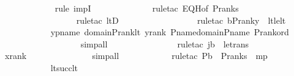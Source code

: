 \begin{isabellebody}
\ \ \ \ \ \ \ \ \ \ \ \isamarkupfalse%
\ {\isacharparenleft}{\kern0pt}rule\ impI{\isacharparenright}{\kern0pt}\ \isanewline
\ \ \ \ \ \ \ \ \ \ \ \isamarkupfalse%
\ {\isacharparenleft}{\kern0pt}rule{\isacharunderscore}{\kern0pt}tac\ EQH{\isacharbrackleft}{\kern0pt}of\ {\isachardoublequoteopen}P{\isacharunderscore}{\kern0pt}rank{\isacharparenleft}{\kern0pt}s{\isacharparenright}{\kern0pt}{\isachardoublequoteclose}{\isacharbrackright}{\kern0pt}{\isacharparenright}{\kern0pt}\ \isanewline
\ \ \ \ \ \ \ \ \ \ \ \ \ \ \ \ \isamarkupfalse%
\ {\isacharparenleft}{\kern0pt}rule{\isacharunderscore}{\kern0pt}tac\ ltD{\isacharparenright}{\kern0pt}\ \isanewline
\ \ \ \ \ \ \ \ \ \ \ \ \ \ \ \ \isamarkupfalse%
{\isacharparenleft}{\kern0pt}rule{\isacharunderscore}{\kern0pt}tac\ b{\isacharequal}{\kern0pt}{\isachardoublequoteopen}P{\isacharunderscore}{\kern0pt}rank{\isacharparenleft}{\kern0pt}y{\isacharparenright}{\kern0pt}{\isachardoublequoteclose}\ \ lt{\isacharunderscore}{\kern0pt}le{\isacharunderscore}{\kern0pt}lt{\isacharparenright}{\kern0pt}\ \isanewline
\ \ \ \ \ \ \ \ \ \ \isamarkupfalse%
\ ypname\ domain{\isacharunderscore}{\kern0pt}P{\isacharunderscore}{\kern0pt}rank{\isacharunderscore}{\kern0pt}lt\ yrank\ P{\isacharunderscore}{\kern0pt}name{\isacharunderscore}{\kern0pt}domain{\isacharunderscore}{\kern0pt}P{\isacharunderscore}{\kern0pt}name\ P{\isacharunderscore}{\kern0pt}rank{\isacharunderscore}{\kern0pt}ord\ \isanewline
\ \ \ \ \ \ \ \ \ \ \ \ \ \ \ \ \ \isamarkupfalse%
\ simp{\isacharunderscore}{\kern0pt}all\ \ \ \isanewline
\ \ \ \ \ \ \ \ \ \ \ \isamarkupfalse%
\ {\isacharparenleft}{\kern0pt}rule{\isacharunderscore}{\kern0pt}tac\ j{\isacharequal}{\kern0pt}b\ \ le{\isacharunderscore}{\kern0pt}trans{\isacharparenright}{\kern0pt}\ \isanewline
\ \ \ \ \ \ \ \ \ \ \isamarkupfalse%
\ xrank\ \isanewline
\ \ \ \ \ \ \ \ \ \ \ \ \isamarkupfalse%
\ simp{\isacharunderscore}{\kern0pt}all\ \isanewline
\ \ \ \ \ \ \ \ \ \ \isamarkupfalse%
{\isacharparenleft}{\kern0pt}rule{\isacharunderscore}{\kern0pt}tac\ P{\isacharequal}{\kern0pt}{\isachardoublequoteopen}b\ {\isacharless}{\kern0pt}\ P{\isacharunderscore}{\kern0pt}rank{\isacharparenleft}{\kern0pt}s{\isacharparenright}{\kern0pt}{\isachardoublequoteclose}\ \ mp{\isacharparenright}{\kern0pt}\ \isanewline
\ \ \ \ \ \ \ \ \ \ \isamarkupfalse%
\ lt{\isacharunderscore}{\kern0pt}succ{\isacharunderscore}{\kern0pt}lt\ \isanewline

\end{isabellebody}
